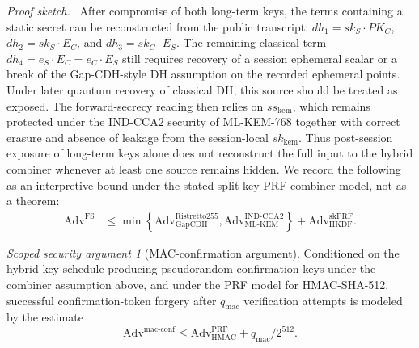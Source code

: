 \documentclass[preprint,12pt]{elsarticle}
\theoremstyle{remark}
\newtheorem{claim}{Scoped security argument}[section]
\newenvironment{sketchproof}{\par\noindent\textit{Proof sketch.}\ }{\par}
\begin{document}
\begin{sketchproof}
After compromise of both long-term keys, the terms containing a static
secret can be reconstructed from the public transcript:
$dh_1 = sk_S \cdot PK_C$, $dh_2 = sk_S \cdot E_C$, and
$dh_3 = sk_C \cdot E_S$. The remaining classical term
$dh_4 = e_S \cdot E_C = e_C \cdot E_S$ still requires recovery of a
session ephemeral scalar or a break of the Gap-CDH-style DH assumption on
the recorded ephemeral points. Under later quantum recovery of classical
DH, this source should be treated as exposed. The forward-secrecy reading
then relies on $ss_{\mathrm{kem}}$, which remains protected under the
IND-CCA2 security of ML-KEM-768 together with correct erasure and absence of
leakage from the session-local $sk_{\mathrm{kem}}$. Thus post-session
exposure of long-term keys alone does not reconstruct the full input to the
hybrid combiner whenever at least one source remains hidden. We record the
following as an interpretive bound under the stated split-key PRF combiner
model, not as a theorem:
\begin{equation}
  \label{eq:fs-advantage-bound}
  \begin{aligned}
    \mathrm{Adv}^{\mathrm{FS}}
    &\leq
    \min\!\left\{
      \mathrm{Adv}_{\mathrm{GapCDH}}^{\mathrm{Ristretto255}},
      \mathrm{Adv}_{\mathrm{ML\text{-}KEM}}^{\mathrm{IND\text{-}CCA2}}
    \right\}
    + \mathrm{Adv}_{\mathrm{HKDF}}^{\mathrm{skPRF}}.
  \end{aligned}
\end{equation}
\end{sketchproof}

\begin{claim}[MAC-confirmation argument]
Conditioned on the hybrid key schedule producing pseudorandom confirmation
keys under the combiner assumption above, and under the PRF model for
HMAC-SHA-512, successful confirmation-token forgery after $q_{\mathrm{mac}}$
verification attempts is modeled by the estimate
\[
  \mathrm{Adv}^{\mathrm{mac\text{-}conf}} \leq
  \mathrm{Adv}_{\mathrm{HMAC}}^{\mathrm{PRF}} +
  q_{\mathrm{mac}} / 2^{512}.
\]
\end{claim}
\end{document}
